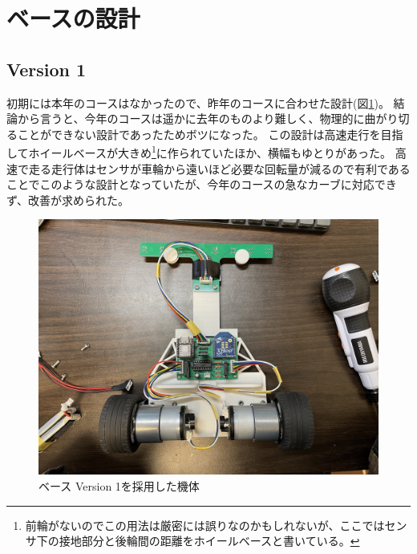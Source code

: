 \documentclass{ltjsreport}
\begin{document}
\section{ベースの設計}
\subsection{Version 1}
初期には本年のコースはなかったので、昨年のコースに合わせた設計(図\ref{fig:v1_machine})。
結論から言うと、今年のコースは遥かに去年のものより難しく、物理的に曲がり切ることができない設計であったためボツになった。
この設計は高速走行を目指してホイールベースが大きめ\footnote{前輪がないのでこの用法は厳密には誤りなのかもしれないが、ここではセンサ下の接地部分と後輪間の距離をホイールベースと書いている。}に作られていたほか、横幅もゆとりがあった。
高速で走る走行体はセンサが車輪から遠いほど必要な回転量が減るので有利であることでこのような設計となっていたが、今年のコースの急なカーブに対応できず、改善が求められた。


\begin{figure}[bth]
  \centering
  \includegraphics[keepaspectratio, scale=0.11]
       {img/ver1_machine.jpg}
  \caption{ベース Version 1を採用した機体}
  \label{fig:v1_machine}
 \end{figure}
\end{document}

